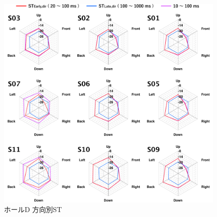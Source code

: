 \documentclass[11pt,a4j]{jreport}
\begin{document}
\begin{figure}[H]
  \centering
  \includegraphics[scale=.77]{images/realHallDirSt/allPoint/reshaped/d.pdf}
  \caption{ホールD 方向別ST}
  \label{fig:ホールD 方向別ST}
\end{figure}
\end{document}
